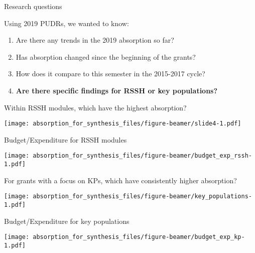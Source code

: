 \documentclass[ignorenonframetext,]{beamer}
\providecommand{\tightlist}{%
  \setlength{\itemsep}{0pt}\setlength{\parskip}{0pt}}
\begin{document}
\begin{frame}{Research questions}
\protect\hypertarget{research-questions-4}{}

Using 2019 PUDRs, we wanted to know:

\begin{enumerate}
\tightlist
\item
  Are there any trends in the 2019 absorption so far?
\item
  Has absorption changed since the beginning of the grants?
\item
  How does it compare to this semester in the 2015-2017 cycle?
\item
  \textbf{Are there specific findings for RSSH or key populations?}
\end{enumerate}

\end{frame}

\begin{frame}{Within RSSH modules, which have the highest absorption?}
\protect\hypertarget{within-rssh-modules-which-have-the-highest-absorption}{}

\texttt{[image: absorption\_for\_synthesis\_files/figure-beamer/slide4-1.pdf]}

\end{frame}

\begin{frame}{Budget/Expenditure for RSSH modules}
\protect\hypertarget{budgetexpenditure-for-rssh-modules}{}

\texttt{[image: absorption\_for\_synthesis\_files/figure-beamer/budget\_exp\_rssh-1.pdf]}

\end{frame}

\begin{frame}{For grants with a focus on KPs, which have consistently
higher absorption?}
\protect\hypertarget{for-grants-with-a-focus-on-kps-which-have-consistently-higher-absorption}{}

\texttt{[image: absorption\_for\_synthesis\_files/figure-beamer/key\_populations-1.pdf]}

\end{frame}

\begin{frame}{Budget/Expenditure for key populations}
\protect\hypertarget{budgetexpenditure-for-key-populations}{}

\texttt{[image: absorption\_for\_synthesis\_files/figure-beamer/budget\_exp\_kp-1.pdf]}

\end{frame}
\end{document}
